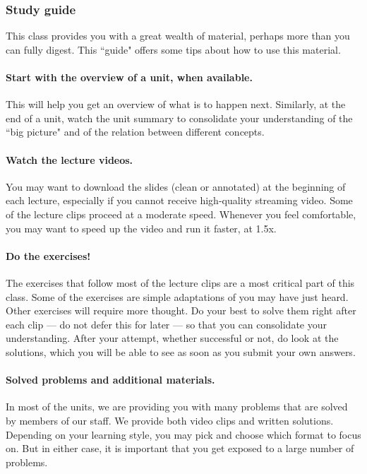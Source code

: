 \documentclass[pdftex, brazil, 12pt, twoside]{article}
\begin{document}
\subsubsection{Study guide}
\label{ovw0-ci-sg}

This class provides you with a great wealth of material, perhaps more than you can
fully digest. This “guide" offers some tips about how to use this material.

\paragraph{Start with the overview of a unit, when available.} This will help you
get an overview of what is to happen next. Similarly, at the end of a unit, watch
the unit summary to consolidate your understanding of the “big picture" and of the
relation between different concepts.

\paragraph{Watch the lecture videos.} You may want to download the slides (clean
or annotated) at the beginning of each lecture, especially if you cannot receive
high-quality streaming video. Some of the lecture clips proceed at a moderate speed.
Whenever you feel comfortable, you may want to speed up the video and run it faster, at 1.5x.

\paragraph{Do the exercises!} The exercises that follow most of the lecture clips are
a most critical part of this class. Some of the exercises are simple adaptations of
you may have just heard. Other exercises will require more thought. Do your best to
solve them right after each clip --- do not defer this for later --- so that you can
consolidate your understanding. After your attempt, whether successful or not, do
look at the solutions, which you will be able to see as soon as you submit your own
answers.

\paragraph{Solved problems and additional materials.} In most of the units, we are
providing you with many problems that are solved by members of our staff. We provide
both video clips and written solutions. Depending on your learning style, you may
pick and choose which format to focus on. But in either case, it is important that
you get exposed to a large number of problems.
\end{document}
